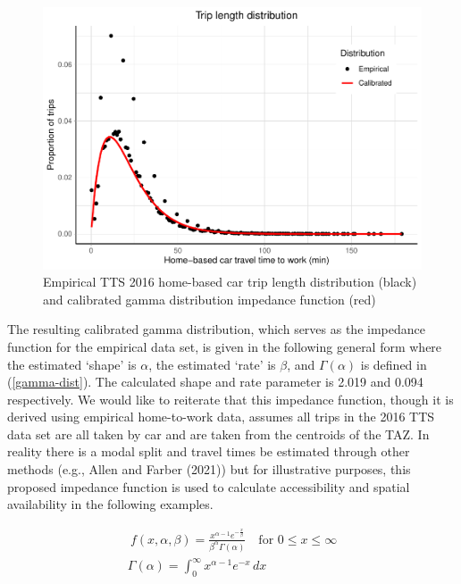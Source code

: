 \documentclass[]{elsarticle} %
\begin{document}
\begin{figure}
\includegraphics[width=1\linewidth]{Spatial-Availability_files/figure-latex/TLD-Gamma-plot-1} \caption{\label{fig:TLD-Gamma-plot}Empirical TTS 2016 home-based car trip length distribution (black) and calibrated gamma distribution impedance function (red)}\label{fig:TLD-Gamma-plot}
\end{figure}

The resulting calibrated gamma distribution, which serves as the
impedance function for the empirical data set, is given in the following
general form where the estimated `shape' is \(\alpha\), the estimated
`rate' is \(\beta\), and \(\Gamma(\alpha)\) is defined in
(\ref{gamma-dist}). The calculated shape and rate parameter is 2.019 and
0.094 respectively. We would like to reiterate that this impedance
function, though it is derived using empirical home-to-work data,
assumes all trips in the 2016 TTS data set are all taken by car and are
taken from the centroids of the TAZ. In reality there is a modal split
and travel times be estimated through other methods (e.g., Allen and
Farber (2021)) but for illustrative purposes, this proposed impedance
function is used to calculate accessibility and spatial availability in
the following examples.

\begin{equation}
\label{gamma-dist}
\begin{array}{l}\ 
f(x, \alpha, \beta) = \frac {x^{\alpha-1}e^{-\frac{x}{\beta}}}{ \beta^{\alpha}\Gamma(\alpha)} \quad \text{for } 0 \leq x \leq \infty\\

\Gamma(\alpha) =  \int_{0}^{\infty} x^{\alpha-1}e^{-x} \,dx\\
\end{array}
\end{equation}
\end{document}
